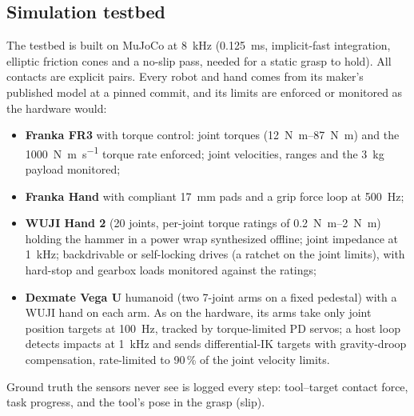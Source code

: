 \subsection{Simulation testbed}
\label{sec:testbed}
The testbed is built on MuJoCo \cite{todorov2012mujoco} at \SI{8}{\kilo\hertz} (\SI{0.125}{\milli\second},
implicit-fast integration, elliptic friction cones and a no-slip pass, needed for a static grasp to hold). All
contacts are explicit pairs. Every robot and hand comes from its maker's published model at a pinned commit, and its
limits are enforced or monitored as the hardware would:
\begin{itemize}
  \item \textbf{Franka FR3} with torque control: joint torques (\SIrange{12}{87}{\newton\metre}) and the
    \SI{1000}{\newton\metre\per\second} torque rate enforced; joint velocities, ranges and the \SI{3}{\kilo\gram}
    payload monitored;
  \item \textbf{Franka Hand} with compliant \SI{17}{\milli\metre} pads and a grip force loop at \SI{500}{\hertz};
  \item \textbf{WUJI Hand 2} (20 joints, per-joint torque ratings of \SIrange{0.2}{2}{\newton\metre}) holding the
    hammer in a power wrap synthesized offline; joint impedance at \SI{1}{\kilo\hertz}; backdrivable or
    self-locking drives (a ratchet on the joint limits), with hard-stop and gearbox loads monitored against the
    ratings;
  \item \textbf{Dexmate Vega U} humanoid (two 7-joint arms on a fixed pedestal) with a WUJI hand on each arm. As
    on the hardware, its arms take only joint position targets at \SI{100}{\hertz}, tracked by torque-limited PD
    servos; a host loop detects impacts at \SI{1}{\kilo\hertz} and sends differential-IK targets with gravity-droop
    compensation, rate-limited to 90\,\% of the joint velocity limits.
\end{itemize}
Ground truth the sensors never see is logged every step: tool--target contact force, task progress, and the tool's
pose in the grasp (slip).

